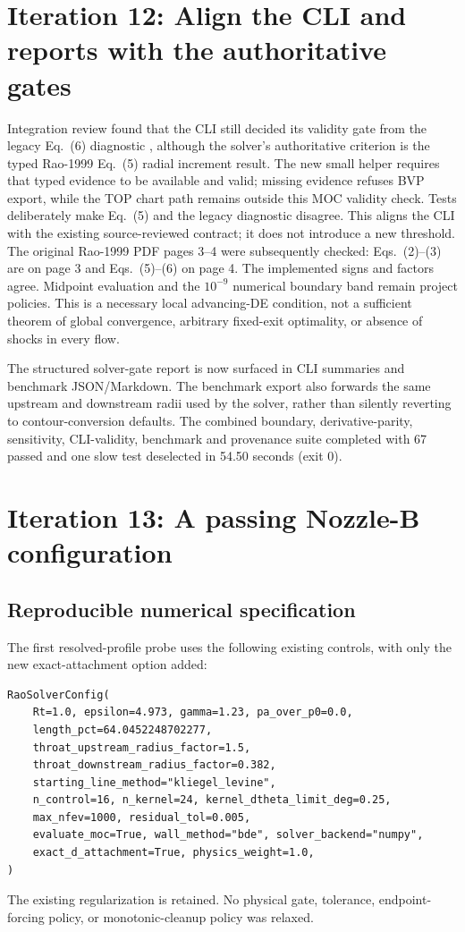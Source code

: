 \section{Iteration 12: Align the CLI and reports with the authoritative gates}
Integration review found that the CLI still decided its validity
gate from the legacy Eq.~(6) diagnostic , although the
solver's authoritative criterion is the typed Rao-1999 Eq.~(5) radial
increment result. The new small helper requires that typed evidence to be
available and valid; missing evidence refuses BVP export, while the TOP
chart path remains outside this MOC validity check. Tests deliberately
make Eq.~(5) and the legacy diagnostic disagree. This aligns the CLI with
the existing source-reviewed contract; it does not introduce a new threshold.
The original Rao-1999 PDF pages 3--4 were subsequently checked:
Eqs.~(2)--(3) are on page 3 and Eqs.~(5)--(6) on page 4. The implemented
signs and factors agree. Midpoint evaluation and the $10^{-9}$ numerical
boundary band remain project policies. This is a necessary local
advancing-DE condition, not a sufficient theorem of global convergence,
arbitrary fixed-exit optimality, or absence of shocks in every flow.

The structured solver-gate report is now surfaced in CLI summaries and
benchmark JSON/Markdown. The benchmark export also forwards the same
upstream and downstream radii used by the solver, rather than silently
reverting to contour-conversion defaults. The combined boundary,
derivative-parity, sensitivity, CLI-validity, benchmark and provenance
suite completed with 67 passed and one slow test deselected in 54.50
seconds (exit 0).

\section{Iteration 13: A passing Nozzle-B configuration}
\subsection{Reproducible numerical specification}
The first resolved-profile probe uses the following existing controls,
with only the new exact-attachment option added:
\begin{lstlisting}
RaoSolverConfig(
    Rt=1.0, epsilon=4.973, gamma=1.23, pa_over_p0=0.0,
    length_pct=64.0452248702277,
    throat_upstream_radius_factor=1.5,
    throat_downstream_radius_factor=0.382,
    starting_line_method="kliegel_levine",
    n_control=16, n_kernel=24, kernel_dtheta_limit_deg=0.25,
    max_nfev=1000, residual_tol=0.005,
    evaluate_moc=True, wall_method="bde", solver_backend="numpy",
    exact_d_attachment=True, physics_weight=1.0,
)
\end{lstlisting}
The existing regularization is retained. No physical gate, tolerance,
endpoint-forcing policy, or monotonic-cleanup policy was relaxed.

